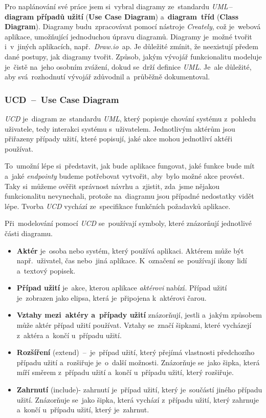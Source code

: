 \documentclass[10pt,a4paper]{article}
\begin{document}
            Pro naplánování své práce jsem si~vybral diagramy ze~standardu \emph{UML}\,--\,\textbf{diagram případů užití} (\textbf{Use Case Diagram}) a~\textbf{diagram~tříd} (\textbf{Class Diagram}). Diagramy budu~zpracovávat pomocí nástroje \emph{Creately}, což je~webová aplikace, umožňující jednoduchou úpravu diagramů. Diagramy je~možné tvořit i~v~jiných aplikacích, např.~\emph{Draw.io}~ap. Je důležité zmínit, že neexistují předem dané postupy, jak diagramy tvořit. Způsob, jakým vývojář funkcionalitu modeluje je~čistě na~jeho osobním zvážení, dokud se~drží definice \emph{UML}. Je~ale důležité, aby svá~rozhodnutí vývojář zdůvodnil a~průběžně dokumentoval. \cite{uml:diagram}

            \subsubsection{UCD~--~Use Case Diagram}
                \emph{UCD} je~diagram ze~standardu \emph{UML}, který popisuje chování systému z~pohledu uživatele, tedy interakci systému s~uživatelem. Jednotlivým aktérům jsou přiřazeny případy užití, které popisují, jaké akce mohou jednotliví aktéři používat.

                To~umožní lépe si~představit, jak bude aplikace fungovat, jaké funkce bude mít a~jaké \emph{endpointy} budeme potřebovat vytvořit, aby~bylo možné akce provést. Taky si~můžeme ověřit správnost návrhu a~zjistit, zda~jsme nějakou funkcionalitu nevynechali, protože na~diagramu jsou případné nedostatky vidět lépe. Tvorba \emph{UCD} vychází ze~specifikace funkčních požadavků aplikace. \cite{uml:usecase}

                Při~modelování pomocí \emph{UCD} se~používají symboly, které znázorňují jednotlivé části diagramu.
                \begin{itemize}
                    \item \textbf{Aktér} je~osoba nebo systém, který používá aplikaci. Aktérem může být např.~uživatel, čas nebo~jiná aplikace. K~označení se~používají ikony lidí a~textový popisek.
                    \item \textbf{Případ užití} je~akce, kterou aplikace \emph{aktérovi} nabízí. Případ užití je~zobrazen jako elipsa, která je~připojena k~aktérovi čarou.
                    \item \textbf{Vztahy mezi~aktéry a~případy užití} znázorňují, jestli a~jakým způsobem může aktér případ užití používat. Vztahy se~značí šipkami, které vycházejí z~aktéra a~končí u~případu užití.
                    \item \textbf{Rozšíření} (extend)~--~je~případ užití, který přejímá vlastnosti předchozího případu užití a~rozšiřuje je~o~další možnosti. Znázorňuje se~jako šipka, která míří směrem z~případu užití a~končí u~případu užití, který rozšiřuje.
                    \item \textbf{Zahrnutí} (include)- zahrnutí je~případ užití, který je~součástí jiného případu užití. Znázorňuje se~jako šipka, která vychází z~případu užití, který zahrnuje a~končí u~případu užití, který je~zahrnut.
                \end{itemize}
\end{document}
